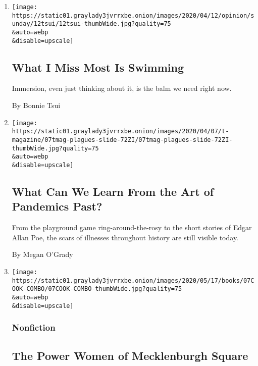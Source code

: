 \begin{enumerate}
\def\labelenumi{\arabic{enumi}.}
\item
  \href{/2020/04/10/opinion/sunday/swimming-covid.html}{}

  \texttt{[image: https://static01.graylady3jvrrxbe.onion/images/2020/04/12/opinion/sunday/12tsui/12tsui-thumbWide.jpg?quality=75\\\&auto=webp\\\&disable=upscale]}

  \hypertarget{what-i-miss-most-is-swimming}{%
  \subsection{What I Miss Most Is
  Swimming}\label{what-i-miss-most-is-swimming}}

  Immersion, even just thinking about it, is the balm we need right now.

  By Bonnie Tsui
\item
  \href{/2020/04/08/t-magazine/art-coronavirus.html}{}

  \texttt{[image: https://static01.graylady3jvrrxbe.onion/images/2020/04/07/t-magazine/07tmag-plagues-slide-72ZI/07tmag-plagues-slide-72ZI-thumbWide.jpg?quality=75\\\&auto=webp\\\&disable=upscale]}

  \hypertarget{what-can-we-learn-from-the-art-of-pandemics-past}{%
  \subsection{What Can We Learn From the Art of Pandemics
  Past?}\label{what-can-we-learn-from-the-art-of-pandemics-past}}

  From the playground game ring-around-the-rosy to the short stories of
  Edgar Allan Poe, the scars of illnesses throughout history are still
  visible today.

  By Megan O'Grady
\item
  \href{/2020/04/07/books/review/square-haunting-francesca-wade.html}{}

  \texttt{[image: https://static01.graylady3jvrrxbe.onion/images/2020/05/17/books/07COOK-COMBO/07COOK-COMBO-thumbWide.jpg?quality=75\\\&auto=webp\\\&disable=upscale]}

  \hypertarget{nonfiction}{%
  \subsubsection{Nonfiction}\label{nonfiction}}

  \hypertarget{the-power-women-of-mecklenburgh-square}{%
  \subsection{The Power Women of Mecklenburgh
  Square}\label{the-power-women-of-mecklenburgh-square}}


\end{enumerate}
